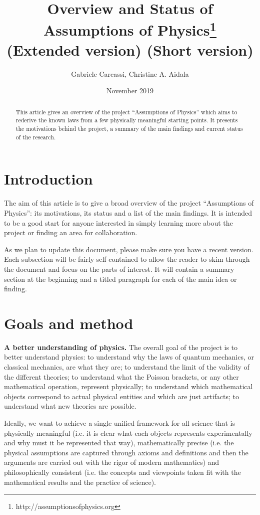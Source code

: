 \documentclass[twocolumn]{article}
\title{Overview and Status of Assumptions of Physics\footnote{http://assumptionsofphysics.org} \\
\ifextended (Extended version)
\else (Short version)
\fi}
\author{Gabriele Carcassi, Christine A. Aidala}
\date{November 2019}
\begin{document}
\maketitle

\begin{abstract}
	This article gives an overview of the project ``Assumptions of Physics'' which aims to rederive the known laws from a few physically meaningful starting points. It presents the motivations behind the project, a summary of the main findings and current status of the research.	
\end{abstract}

\section{Introduction}

The aim of this article is to give a broad overview of the project ``Assumptions of Physics'': its motivations, its status and a list of the main findings. It is intended to be a good start for anyone interested in simply learning more about the project or finding an area for collaboration.

As we plan to update this document, please make sure you have a recent version. Each subsection will be fairly self-contained to allow the reader to skim through the document and focus on the parts of interest. It will contain a summary section at the beginning and a titled paragraph for each of the main idea or finding.

\section{Goals and method}

\textbf{A better understanding of physics.} The overall goal of the project is to better understand physics: to understand why the laws of quantum mechanics, or classical mechanics, are what they are; to understand the limit of the validity of the different theories; to understand what the Poisson brackets, or any other mathematical operation, represent physically; to understand which mathematical objects correspond to actual physical entities and which are just artifacts; to understand what new theories are possible.

Ideally, we want to achieve a single unified framework for all science that is physically meaningful (i.e. it is clear what each objects represents experimentally and why must it be represented that way), mathematically precise (i.e. the physical assumptions are captured through axioms and definitions and then the arguments are carried out with the rigor of modern mathematics) and philosophically consistent (i.e. the concepts and viewpoints taken fit with the mathematical results and the practice of science).
\end{document}
